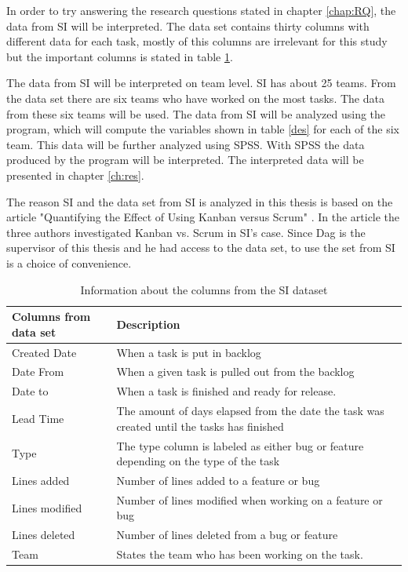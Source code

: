 \documentclass[UKenglish]{ifimaster}  %
\begin{document}
In order to try answering the research questions stated in chapter \ref{chap:RQ}, the data from SI will be interpreted. The data set contains thirty columns with different data for each task, mostly of this columns are irrelevant for this study but the important columns is stated in table \ref{IC}.

The data from SI will be interpreted on team level.  SI has about 25 teams. From the data set there are six teams who have worked on the most tasks. The data from these six teams will be used. 
The data from SI will be analyzed using the program, which will compute the variables shown in table \ref{des} for each of the six team. This data will be further analyzed using SPSS. With SPSS the data produced by the program will be interpreted. The interpreted data will be presented in chapter \ref{ch:res}. 

The reason SI and the data set from SI is analyzed in this thesis is based on the article "Quantifying the Effect of Using Kanban versus Scrum" \parencite{Dag}. In the article the three authors investigated Kanban vs. Scrum in SI's case. Since Dag is the supervisor of this thesis and he had access to the data set, to use the set from SI is a choice of convenience. 

\begin{table}[!ht]
\begin{center}
    \begin{tabular}{| l | p{5cm} |}
    \hline
     Columns from data set & Description\\ \hline
     Created Date & When a task is put in backlog \\ \hline
     Date From & When a given task is pulled out from the backlog\\ \hline
     Date to & When a task is finished and ready for release. \\ \hline
    Lead Time & The amount of days elapsed from the date the task was created until the tasks has finished  \\ \hline
   Type & The type column is labeled as either bug or feature depending on the type of the task \\ \hline
   Lines added & Number of lines added to a feature or bug \\ \hline
   Lines modified & Number of lines modified when working on a feature or bug \\ \hline
   Lines deleted & Number of lines deleted from a bug or feature \\
    \hline
    Team &States the team who has been working on the task.\\ \hline
    \end{tabular}
\caption{Information about the columns from the SI dataset}
\label{IC} %
\end{center}
\end{table}
\end{document}
